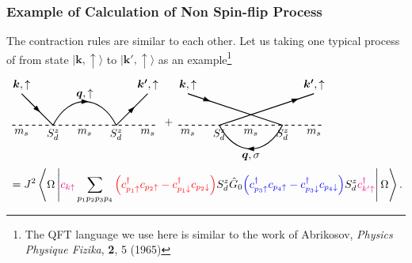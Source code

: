 \documentclass[10pt,aspectratio=43,xcolor=x11names]{beamer}%
\begin{document}
		\begin{frame}\frametitle{Example of Calculation of Non Spin-flip Process}
			The contraction rules are similar to each other. Let us taking one typical process of from state $|\bm{k},\uparrow\rangle$ to $|\bm{k'},\uparrow\rangle$ as an example\footnote{The QFT language we use here is similar to the work of Abrikosov, \textit{Physics Physique Fizika}, \textbf{2}, 5 (1965)}
			\begin{align*}
				&\begin{tikzpicture}[baseline]
					\draw[thick,dashed] (-2.3,0)--(2.3,0);
					\draw[thick] (-2,1)--(-1,0) .. controls (-0.5,1) and (0.5,1) ..(1,0)--(2,1);
					\node[below] at (2,0) {$m_s$};
					\node[below] at (-2,0) {$m_s$};
					\node[below] at (0,0) {$m_s$};
					\node[below] at (1,0) {$S_d^z$};
					\node[below] at (-1,0) {$S_d^z$};
					\node[rotate=-45] at (-1.5,0.5) {\arrow};
					\node at (0,0.75) {\arrow};
					\node at (0,1) {$\bm{q},\uparrow$};
					\node[above] at (-2,1) {$\bm{k},\uparrow$};
					\node[above] at (2,1) {$\bm{k'},\uparrow$};
					\node[rotate=45] at (1.5,0.5) {\arrow};
				\end{tikzpicture}+\begin{tikzpicture}[baseline]
					\draw[thick,dashed] (-2.3,0)--(2.3,0);
					\draw[thick] (-2,1)--(1,0) .. controls (0.5,-1) and (-0.5,-1) .. (-1,0)--(2,1);
					\node[below] at (2,0) {$m_s$};
					\node[below] at (-2,0) {$m_s$};
					\node[below] at (0,0) {$m_s$};
					\node[below] at (1,0) {$S_d^z$};
					\node[below] at (-1,0) {$S_d^z$};
					\node[rotate=-20] at (-1.4,0.8) {\arrow};
					\node[rotate=180] at (0,-0.75) {\arrow};
					\node at (0,-1) {$\bm{q},\sigma$};
					\node[above] at (-2,1) {$\bm{k},\uparrow$};
					\node[above] at (2,1) {$\bm{k'},\uparrow$};
					\node[rotate=20] at (1.4,0.8) {\arrow};
				\end{tikzpicture}\\
				&=J^2\left\langle\Omega\left|{\color{magenta}c_{k\uparrow}}\sum_{p_1p_2p_3p_4}{\color{red}\left(c_{p_1\uparrow}^\dagger c_{p_2\uparrow}-c_{p_1\downarrow}^\dagger c_{p_2\downarrow}\right)}S_d^z \hat{G}_0{\color{blue}\left(c_{p_3\uparrow}^\dagger c_{p_4\uparrow}-c_{p_3\downarrow}^\dagger c_{p_4\downarrow}\right)}S_d^z{\color{magenta}c_{k'\uparrow}^\dagger}\right|\Omega\right\rangle.
			\end{align*}
		\end{frame}
\end{document}
